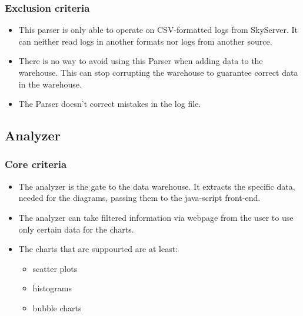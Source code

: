  
\subsubsection{Exclusion criteria}
\begin{itemize}
\item This parser is only able to operate on CSV-formatted logs from SkyServer. 
It can neither read logs in another formats nor logs from another source.

\item There is no way to avoid using this Parser when adding data to the warehouse. 
This can stop corrupting the warehouse to guarantee correct data in the warehouse.

\item The Parser doesn't correct mistakes in the log file.
\end{itemize}



\subsection{Analyzer}

\subsubsection{Core criteria}
\begin{itemize}
\item The analyzer is the gate to the data warehouse. It extracts the specific data, 
needed for the diagrams, passing them to the java-script front-end.
\item The analyzer can take filtered information via webpage from the user 
to use only certain data for the charts.
\item The charts that are suppourted are at least:
\begin{itemize}
\item scatter plots
\item histograms
\item bubble charts
\end{itemize}

\end{itemize}

